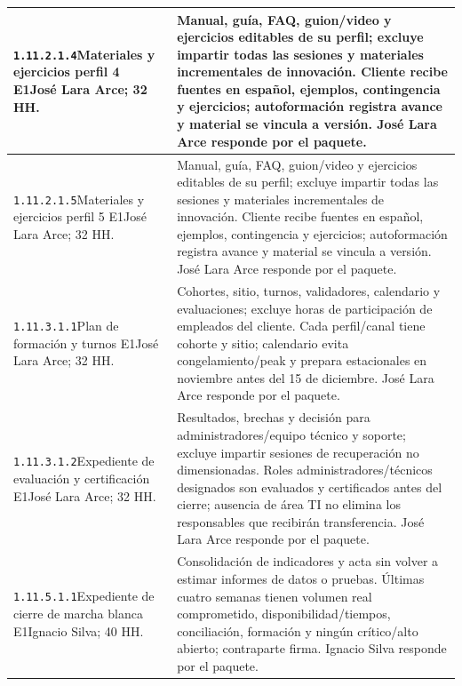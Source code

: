\begin{longtable}{L{52mm}L{91mm}}
\texttt{1.\allowbreak{}11.\allowbreak{}2.\allowbreak{}1.\allowbreak{}4}\newline Materiales y ejercicios perfil 4 E1\newline José Lara Arce; 32 HH. & Manual, guía, FAQ, guion/video y ejercicios editables de su perfil; excluye impartir todas las sesiones y materiales incrementales de innovación. Cliente recibe fuentes en español, ejemplos, contingencia y ejercicios; autoformación registra avance y material se vincula a versión. José Lara Arce responde por el paquete.\\\hline
\texttt{1.\allowbreak{}11.\allowbreak{}2.\allowbreak{}1.\allowbreak{}5}\newline Materiales y ejercicios perfil 5 E1\newline José Lara Arce; 32 HH. & Manual, guía, FAQ, guion/video y ejercicios editables de su perfil; excluye impartir todas las sesiones y materiales incrementales de innovación. Cliente recibe fuentes en español, ejemplos, contingencia y ejercicios; autoformación registra avance y material se vincula a versión. José Lara Arce responde por el paquete.\\\hline
\texttt{1.\allowbreak{}11.\allowbreak{}3.\allowbreak{}1.\allowbreak{}1}\newline Plan de formación y turnos E1\newline José Lara Arce; 32 HH. & Cohortes, sitio, turnos, validadores, calendario y evaluaciones; excluye horas de participación de empleados del cliente. Cada perfil/canal tiene cohorte y sitio; calendario evita congelamiento/peak y prepara estacionales en noviembre antes del 15 de diciembre. José Lara Arce responde por el paquete.\\\hline
\texttt{1.\allowbreak{}11.\allowbreak{}3.\allowbreak{}1.\allowbreak{}2}\newline Expediente de evaluación y certificación E1\newline José Lara Arce; 32 HH. & Resultados, brechas y decisión para administradores/equipo técnico y soporte; excluye impartir sesiones de recuperación no dimensionadas. Roles administradores/técnicos designados son evaluados y certificados antes del cierre; ausencia de área TI no elimina los responsables que recibirán transferencia. José Lara Arce responde por el paquete.\\\hline
\texttt{1.\allowbreak{}11.\allowbreak{}5.\allowbreak{}1.\allowbreak{}1}\newline Expediente de cierre de marcha blanca E1\newline Ignacio Silva; 40 HH. & Consolidación de indicadores y acta sin volver a estimar informes de datos o pruebas. Últimas cuatro semanas tienen volumen real comprometido, disponibilidad/tiempos, conciliación, formación y ningún crítico/alto abierto; contraparte firma. Ignacio Silva responde por el paquete.\\\hline

\end{longtable}
